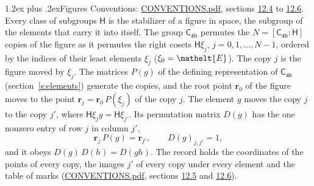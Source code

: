 \documentclass[10pt,a4paper]{article}
\makeatletter
\renewcommand\section{\@startsection{section}{1}{\z@}{-3ex plus -1ex minus -.2ex}%
  {1.2ex plus .2ex}{\normalfont\large\sffamily\bfseries\color{parttitle}}}
\numberwithin{equation}{section}
\newcommand{\eltfont}[1]{{\let\sigma\eltsigma\mathelt{#1}}}
\newcommand{\grp}[1]{\mathsf{#1}}
\newcommand{\cls}[1]{\eltfont{#1}}
\newcommand{\pointr}{\mathbf{r}}
\makeatother
\begin{document}
\section{Figures}\label{s:permutation}
Conventions: \href{../../CONVENTIONS.pdf}{CONVENTIONS.pdf}, sections \href{../../CONVENTIONS.pdf\#conv.12.4}{12.4} to \href{../../CONVENTIONS.pdf\#conv.12.6}{12.6}.
Every class of subgroups $\grp{H}$ is the stabilizer of a figure in space, the subgroup of the elements that carry it into itself. \label{n:local.orbit.size}\label{n:element.coset.least}\label{n:index.coset}The group $\grp{C_{4h}}$ permutes the $N = [\grp{C_{4h}} : \grp{H}]$ copies of the figure as it permutes the right cosets $\grp{H}\xi_j$, $j = 0, 1, \dots, N - 1$, ordered by the indices of their least elements $\xi_j$ ($\xi_0 = \cls{E}$). The copy $j$ is the figure moved by $\xi_j$. The matrices $P(g)$ of the defining representation of $\grp{C_{4h}}$ (section~\ref{s:elements}) generate the copies, and the root point $\pointr_0$ of the figure moves to the point $\pointr_j = \pointr_0\, P(\xi_j)$ of the copy $j$. \label{n:local.coset.image}The element $g$ moves the copy $j$ to the copy $j'$, where $\grp{H}\xi_j g = \grp{H}\xi_{j'}$. \label{n:local.matrix.permutation}Its permutation matrix $D(g)$ has the one nonzero entry of row $j$ in column $j'$,
\begin{equation}\label{e:perm.matrix}\pointr_j\, P(g) = \pointr_{j'}, \qquad D(g)_{j,j'} = 1,\end{equation}
and it obeys $D(g)\, D(h) = D(gh)$. The record holds the coordinates of the points of every copy, the images $j'$ of every copy under every element and the table of marks (\href{../../CONVENTIONS.pdf}{CONVENTIONS.pdf}, sections \href{../../CONVENTIONS.pdf\#conv.12.5}{12.5} and \href{../../CONVENTIONS.pdf\#conv.12.6}{12.6}).
\end{document}
